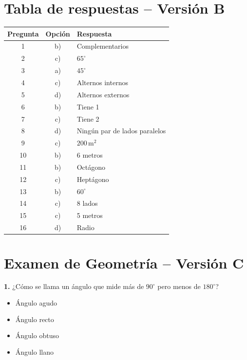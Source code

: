 \newpage

\section*{Tabla de respuestas -- Versión B}

\begin{center}
\begin{tabular}{|c|c|l|}
\hline
\textbf{Pregunta} & \textbf{Opción} & \textbf{Respuesta} \\ \hline
1  & b) & Complementarios \\ \hline
2  & c) & $65^\circ$ \\ \hline
3  & a) & $45^\circ$ \\ \hline
4  & c) & Alternos internos \\ \hline
5  & d) & Alternos externos \\ \hline
6  & b) & Tiene 1 \\ \hline
7  & c) & Tiene 2 \\ \hline
8  & d) & Ningún par de lados paralelos \\ \hline
9  & c) & $200\,\text{m}^2$ \\ \hline
10 & b) & 6 metros \\ \hline
11 & b) & Octágono \\ \hline
12 & c) & Heptágono \\ \hline
13 & b) & $60^\circ$ \\ \hline
14 & c) & 8 lados \\ \hline
15 & c) & 5 metros \\ \hline
16 & d) & Radio \\ \hline
\end{tabular}
\end{center}

\newpage

\section*{Examen de Geometría -- Versión C}

\noindent\textbf{1.} ¿Cómo se llama un ángulo que mide más de $90^\circ$ pero menos de $180^\circ$?

\begin{itemize}
    \item[a)] Ángulo agudo
    \item[b)] Ángulo recto
    \item[c)] Ángulo obtuso
    \item[d)] Ángulo llano
\end{itemize}


